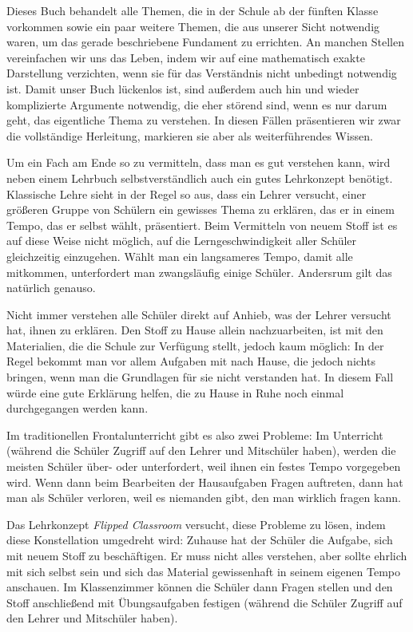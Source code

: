 \documentclass[../main.tex]{subfiles}
\begin{document}
Dieses Buch behandelt alle Themen, die in der Schule ab der fünften Klasse vorkommen sowie ein paar weitere Themen, die aus unserer Sicht notwendig waren, um das gerade beschriebene Fundament zu errichten. An manchen Stellen vereinfachen wir uns das Leben, indem wir auf eine mathematisch exakte Darstellung verzichten, wenn sie für das Verständnis nicht unbedingt notwendig ist. Damit unser Buch lückenlos ist, sind außerdem auch hin und wieder komplizierte Argumente notwendig, die eher störend sind, wenn es nur darum geht, das eigentliche Thema zu verstehen. In diesen Fällen präsentieren wir zwar die vollständige Herleitung, markieren sie aber als weiterführendes Wissen.

Um ein Fach am Ende so zu vermitteln, dass man es gut verstehen kann, wird neben einem Lehrbuch selbstverständlich auch ein gutes Lehrkonzept benötigt. Klassische Lehre sieht in der Regel so aus, dass ein Lehrer versucht, einer größeren Gruppe von Schülern ein gewisses Thema zu erklären, das er in einem Tempo, das er selbst wählt, präsentiert. Beim Vermitteln von neuem Stoff ist es auf diese Weise nicht möglich, auf die Lerngeschwindigkeit aller Schüler gleichzeitig einzugehen. Wählt man ein langsameres Tempo, damit alle mitkommen, unterfordert man zwangsläufig einige Schüler. Andersrum gilt das natürlich genauso.

Nicht immer verstehen alle Schüler direkt auf Anhieb, was der Lehrer versucht hat, ihnen zu erklären. Den Stoff zu Hause allein nachzuarbeiten, ist mit den Materialien, die die Schule zur Verfügung stellt, jedoch kaum möglich: In der Regel bekommt man vor allem Aufgaben mit nach Hause, die jedoch nichts bringen, wenn man die Grundlagen für sie nicht verstanden hat. In diesem Fall würde eine gute Erklärung helfen, die zu Hause in Ruhe noch einmal durchgegangen werden kann.

Im traditionellen Frontalunterricht gibt es also zwei Probleme: Im Unterricht (während die Schüler Zugriff auf den Lehrer und Mitschüler haben), werden die meisten Schüler über- oder unterfordert, weil ihnen ein festes Tempo vorgegeben wird.
Wenn dann beim Bearbeiten der Hausaufgaben Fragen auftreten, dann hat man als Schüler verloren, weil es niemanden gibt, den man wirklich fragen kann.

Das Lehrkonzept \emph{Flipped Classroom} versucht, diese Probleme zu lösen, indem diese Konstellation umgedreht wird: Zuhause hat der Schüler die Aufgabe, sich mit neuem Stoff zu beschäftigen. Er muss nicht alles verstehen, aber sollte ehrlich mit sich selbst sein und sich das Material gewissenhaft in seinem eigenen Tempo anschauen. Im Klassenzimmer können die Schüler dann Fragen stellen und den Stoff anschließend mit Übungsaufgaben festigen (während die Schüler Zugriff auf den Lehrer und Mitschüler haben).
\end{document}
